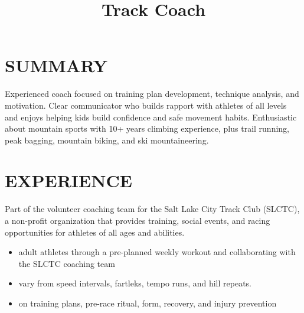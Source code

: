 \documentclass[resmargin, centered, 10pt]{../res}
\begin{document}
\address{\href{mailto:kirkwood.donavin@gmail.com}{Kirkwood.Donavin@Gmail.com}}
\address{+1 (801) 554-6834}
\address{}
\address{}
\address{}

\begin{resume}
    
\fullline

\section{SUMMARY}

Experienced coach focused on training plan development, technique analysis, and motivation. Clear communicator who builds rapport with athletes of all levels and enjoys helping kids build confidence and safe movement habits. Enthusiastic about mountain sports with 10+ years climbing experience, plus trail running, peak bagging, mountain biking, and ski mountaineering.

\fullline

\section{EXPERIENCE}

\title{Track Coach}
\begin{position}
	Part of the volunteer coaching team for the Salt Lake City Track Club (SLCTC), a non-profit organization that provides training, social events, and racing opportunities for athletes of all ages and abilities. \\
	\begin{itemize}
		\item {} adult athletes through a pre-planned weekly workout and collaborating with the SLCTC coaching team
		\item {} vary from speed intervals, fartleks, tempo runs, and hill repeats.
		\item {} on training plans, pre-race ritual, form, recovery, and injury prevention
	\end{itemize}
\end{position}


\end{resume}
\end{document}
